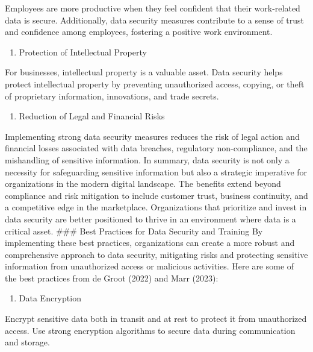 \documentclass[
  letterpaper,
  DIV=11,
  numbers=noendperiod]{scrreprt}
\providecommand{\tightlist}{%
  \setlength{\itemsep}{0pt}\setlength{\parskip}{0pt}}\usepackage{longtable,booktabs,array}
\begin{document}
Employees are more productive when they feel confident that their
work-related data is secure. Additionally, data security measures
contribute to a sense of trust and confidence among employees, fostering
a positive work environment.

\begin{enumerate}
\def\labelenumi{\arabic{enumi}.}
\setcounter{enumi}{10}
\tightlist
\item
  Protection of Intellectual Property
\end{enumerate}

For businesses, intellectual property is a valuable asset. Data security
helps protect intellectual property by preventing unauthorized access,
copying, or theft of proprietary information, innovations, and trade
secrets.

\begin{enumerate}
\def\labelenumi{\arabic{enumi}.}
\setcounter{enumi}{11}
\tightlist
\item
  Reduction of Legal and Financial Risks
\end{enumerate}

Implementing strong data security measures reduces the risk of legal
action and financial losses associated with data breaches, regulatory
non-compliance, and the mishandling of sensitive information. In
summary, data security is not only a necessity for safeguarding
sensitive information but also a strategic imperative for organizations
in the modern digital landscape. The benefits extend beyond compliance
and risk mitigation to include customer trust, business continuity, and
a competitive edge in the marketplace. Organizations that prioritize and
invest in data security are better positioned to thrive in an
environment where data is a critical asset. \#\#\# Best Practices for
Data Security and Training By implementing these best practices,
organizations can create a more robust and comprehensive approach to
data security, mitigating risks and protecting sensitive information
from unauthorized access or malicious activities. Here are some of the
best practices from de Groot (2022) and Marr (2023):

\begin{enumerate}
\def\labelenumi{\arabic{enumi}.}
\tightlist
\item
  Data Encryption
\end{enumerate}

Encrypt sensitive data both in transit and at rest to protect it from
unauthorized access. Use strong encryption algorithms to secure data
during communication and storage.
\end{document}
